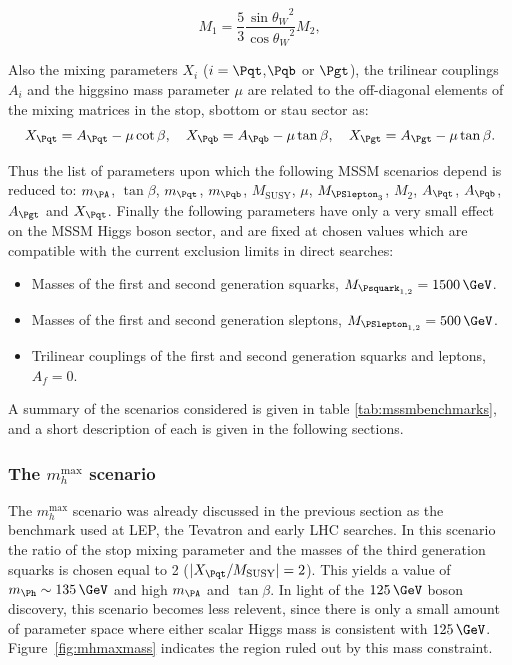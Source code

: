 \begin{equation}
M_{1} = \frac{5}{3}\frac{{\sin{\theta_{W}}}^{2}}{{\cos{\theta_{W}}}^{2}} M_{2},
\label{eq:GUTrelation}
\end{equation}

Also the mixing parameters $X_{i}$ ($i=\Pqt$,$\Pqb$ or
$\Pgt$), the trilinear couplings $A_{i}$ and the higgsino mass parameter $\mu$ 
are related to the off-diagonal elements of the mixing matrices in the
stop, sbottom or stau sector as:
\begin{equation}
X_{\Pqt} = A_{\Pqt} -\mu\cot\beta, \quad X_{\Pqb} = A_{\Pqb} -\mu\tan\beta,
\quad X_{\Pgt} = A_{\Pgt} -\mu\tan\beta .
\end{equation}

Thus the list of parameters upon which the following \ac{MSSM} scenarios depend is
reduced to: $m_{\PA}$, $\tan\beta$, $m_{\Pqt}$, $m_{\Pqb}$, $M_{\text{SUSY}}$,
$\mu$, $M_{\PSlepton_{3}}$, $M_{2}$, $A_{\Pqt}$, $A_{\Pqb}$, $A_{\Pgt}$ and
$X_{\Pqt}$. Finally the following parameters have only a very small effect on
the \ac{MSSM} Higgs boson sector, and are fixed at chosen values which are compatible
with the current exclusion limits in direct searches:

\begin{itemize}
\item Masses of the first and second generation squarks, $M_{\Psquark_{1,2}} =
1500\,\GeV$.
\item Masses of the first and second generation sleptons, $M_{\PSlepton_{1,2}}
= 500\,\GeV$.
\item Trilinear couplings of the first and second generation squarks and
leptons, $A_{f} = 0$.
\end{itemize}

A summary of the scenarios considered is given in table
\ref{tab:mssmbenchmarks}, and a short description of each is given in the
following sections.

\subsubsection{The $m_{h}^{\text{max}}$ scenario}
\label{sec:mhmaxscenario}

The $m_{h}^{\text{max}}$ scenario was already discussed in the previous section
as the benchmark used at LEP, the Tevatron and early LHC searches. 
In this scenario the ratio of the stop mixing parameter and the
masses of the third generation squarks is chosen equal to 2
($|X_{\Pqt}/M_{\text{SUSY}}| = 2$). This yields a value of
$m_{\Ph}\sim135\,\GeV$ and high $m_{\PA}$ and $\tan\beta$. 
In light of the $125\,\GeV$ boson discovery, this scenario becomes less relevent,
since there is only a small amount of parameter space where either scalar
Higgs mass is consistent with $125\,\GeV$. Figure~\ref{fig:mhmaxmass} indicates
the region ruled out by this mass constraint. 

